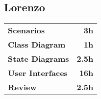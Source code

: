 \subsection*{Lorenzo}
\begin{table}[H]
    \begin{tabular}{lr}
        \toprule
        \textbf{Scenarios}                     & \textbf{3h} \\
        \textbf{Class Diagram}                 & \textbf{1h}   \\
        \textbf{State Diagrams}                & \textbf{2.5h} \\
        \textbf{User Interfaces}               & \textbf{16h}   \\
        \textbf{Review}                        & \textbf{2.5h}   \\
        \bottomrule
    \end{tabular}
\end{table}
